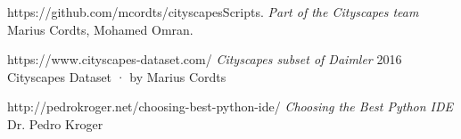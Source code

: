 \newpage



\begin{thebibliography}{12}

 https://github.com/mcordts/cityscapesScripts.
\textit{Part of the Cityscapes team} Marius Cordts, Mohamed Omran.

 https://www.cityscapes-dataset.com/
\textit{Cityscapes subset of Daimler} 2016 Cityscapes Dataset · by Marius Cordts 

 http://pedrokroger.net/choosing-best-python-ide/
\textit{Choosing the Best Python IDE} Dr. Pedro Kroger

\end{thebibliography}
        

